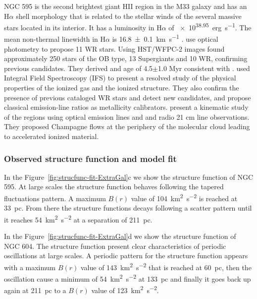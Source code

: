 \documentclass[fleqn,usenatbib, useAMS, a4paper]{mnras}
\newcommand\pos{\ensuremath{_{\mathrm{pos}}}}
\newcommand\ha{\ensuremath{\text{H}\alpha}}
\begin{document}
NGC 595 is the second brightest giant HII region in the M33 galaxy and has an \ha{} shell morphology that is related to the stellar winds of the several massive stars located in its interior.
It has a luminosity in \ha{} of \SI{e38.95}{erg.s^{-1}}\citep{2002MNRAS.329..481B}.
The mean non-thermal linewidth in \ha{} is \SI{16.8 \pm 0.1}{km.s^{-1}} \citep{lagrois2009multi}.
\citet{1993AJ....105.1400D} use optical photometry to propose 11 WR stars. 
Using HST/WFPC-2 images \citet{1996AJ....111.1128M} found approximately 250 stars of the OB type, 13 Supergiants and 10 WR, confirming previous candidates.
They derived and age of 4.5\(\pm\)1.0 Myr consistent with \citet{1993AJ....105.1400D}.
\citet{2010MNRAS.402.1635R} used Integral Field Spectroscopy (IFS) to present a resolved study of the physical properties of the ionized gas and the ionized structure.
They also confirm the presence of previous cataloged WR stars and detect new candidates, and propose classical emission-line ratios as metallicity calibrators.
\citet{lagrois2011} present a kinematic study of the regions using optical emission lines and and radio 21 cm line observations.
They proposed Champagne flows at the periphery of the molecular cloud leading to accelerated ionized material.

\subsubsection{Observed structure function and model fit}
\label{sec:observ-struct-funct-m33}

In the Figure~\ref{fig:strucfunc-fit-ExtraGal}c we show the structure function of NGC 595.
At large scales the structure function behaves following the tapered fluctuations pattern.
A maximum \(B(r)\) value of \SI{104}{km^{2}.s^{-2}} is reached at \SI{33}{pc}. 
From there the structure functions decays following a scatter pattern until it reaches \SI{54}{km^{2}.s^{-2}} at a separation of \SI{211}{pc}.

In the Figure~\ref{fig:strucfunc-fit-ExtraGal}d we show the structure function of NGC 604.
The structure function present clear characteristics of periodic oscillations at large scales.
A periodic pattern for the structure function appears with a maximum \(B(r)\) value of \SI{143}{km^{2}.s^{-2}} that is reached at \SI{60}{pc}, then the oscillation cause a minimum of \SI{54}{km^{2}.s^{-2}} at \SI{133}{pc} and finally it goes back up again at \SI{211}{pc} to a \(B(r)\) value of \SI{123}{km^{2}.s^{-2}}.
\end{document}
